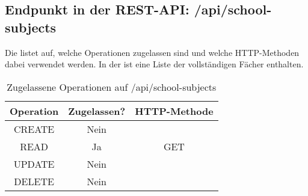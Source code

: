 \subsection{Endpunkt in der REST-API: /api/school-subjects}
\label{sec:end:rest:api:school-subjects}
Die  listet auf, welche Operationen zugelassen sind und welche HTTP-Methoden dabei verwendet werden. 
In der  ist eine Liste der vollständigen Fächer enthalten.


\begin{table}[!htbp]
	\begin{tabular}{|c|c|c|}
		\hline
			\textbf{Operation} & \textbf{Zugelassen?} & \textbf{HTTP-Methode} \\ \hline
			CREATE & Nein & \\ \hline 
			READ & Ja & GET \\ \hline
			UPDATE & Nein & \\ \hline 
			DELETE & Nein & \\ \hline
	\end{tabular}

		\caption{Zugelassene Operationen auf /api/school-subjects}
		\label{tab:end:rest:api:school-subjects:meth}
\end{table}